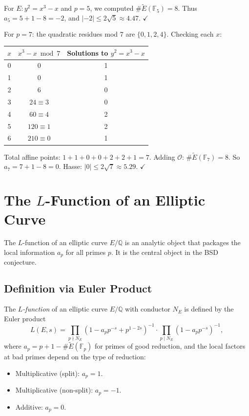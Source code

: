 \begin{example}
For $E: y^2 = x^3 - x$ and $p = 5$, we computed $\#\widetilde{E}(\mathbb{F}_5) = 8$. Thus $a_5 = 5 + 1 - 8 = -2$, and $|{-2}| \le 2\sqrt{5} \approx 4.47$. $\checkmark$

For $p = 7$: the quadratic residues mod 7 are $\{0, 1, 2, 4\}$. Checking each $x$:
\begin{center}
\begin{tabular}{c|c|c}
$x$ & $x^3 - x \bmod 7$ & Solutions to $y^2 = x^3 - x$ \\ \hline
0 & 0 & 1 \\
1 & 0 & 1 \\
2 & $6$ & 0 \\
3 & $24 \equiv 3$ & 0 \\
4 & $60 \equiv 4$ & 2 \\
5 & $120 \equiv 1$ & 2 \\
6 & $210 \equiv 0$ & 1
\end{tabular}
\end{center}
Total affine points: $1+1+0+0+2+2+1 = 7$. Adding $\mathcal{O}$: $\#\widetilde{E}(\mathbb{F}_7) = 8$.
So $a_7 = 7+1-8 = 0$. Hasse: $|0| \le 2\sqrt{7} \approx 5.29$. $\checkmark$
\end{example}

\section{The $L$-Function of an Elliptic Curve}
\label{sec:L-function}

The $L$-function of an elliptic curve $E/\mathbb{Q}$ is an analytic object that packages the local information $a_p$ for all primes $p$. It is the central object in the BSD conjecture.

\subsection{Definition via Euler Product}

\begin{definition}
The \textit{$L$-function} of an elliptic curve $E/\mathbb{Q}$ with conductor $N_E$ is defined by the Euler product
\[
L(E, s) = \prod_{p \nmid N_E} \left(1 - a_p p^{-s} + p^{1-2s}\right)^{-1} \cdot \prod_{p \mid N_E} \left(1 - a_p p^{-s}\right)^{-1},
\]
where $a_p = p + 1 - \#\widetilde{E}(\mathbb{F}_p)$ for primes of good reduction, and the local factors at bad primes depend on the type of reduction:
\begin{itemize}
\item Multiplicative (split): $a_p = 1$.
\item Multiplicative (non-split): $a_p = -1$.
\item Additive: $a_p = 0$.
\end{itemize}
\end{definition}

